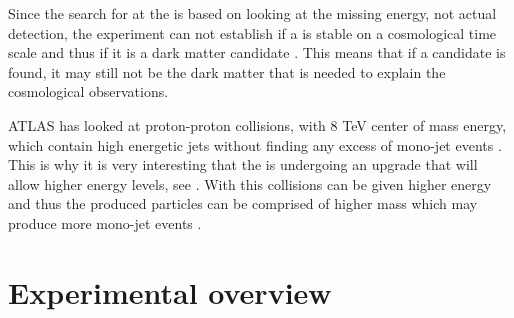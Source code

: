 Since the search for \abbrWIMPS at the \abbrLHC is based on looking at the missing energy, not actual detection, the experiment can not establish if a \abbrWIMP is stable on a cosmological time scale and thus if it is a dark matter candidate \citep{CERN-PH-EP-2012-210}. This means that if a candidate is found, it may still not be the dark matter that is needed to explain the cosmological observations.

ATLAS has looked at proton-proton collisions, with 8 TeV center of mass energy, which contain high energetic jets without finding any excess of mono-jet events \citep{ATLAS:LOI2}. This is why it is very interesting that the \abbrLHC is undergoing an upgrade that will allow higher energy levels, see . With this collisions can be given higher energy and thus the produced particles can be comprised of higher mass which may produce more mono-jet events \citep{ATLAS:LOI2}.
\newpage
\section{Experimental overview}\label{sec:experiment}
